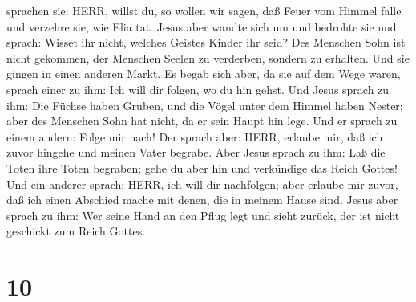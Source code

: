 sprachen sie: HERR, willst du, so wollen wir sagen, daß Feuer vom Himmel
falle und verzehre sie, wie Elia tat.  Jesus aber wandte
sich um und bedrohte sie und sprach: Wisset ihr nicht, welches Geistes
Kinder ihr seid?  Des Menschen Sohn ist nicht gekommen, der
Menschen Seelen zu verderben, sondern zu erhalten.  Und sie
gingen in einen anderen Markt. Es begab sich aber, da sie auf dem Wege
waren, sprach einer zu ihm: Ich will dir folgen, wo du hin gehst.
 Und Jesus sprach zu ihm: Die Füchse haben Gruben, und die
Vögel unter dem Himmel haben Nester; aber des Menschen Sohn hat nicht,
da er sein Haupt hin lege.  Und er sprach zu einem andern:
Folge mir nach! Der sprach aber: HERR, erlaube mir, daß ich zuvor
hingehe und meinen Vater begrabe.  Aber Jesus sprach zu
ihm: Laß die Toten ihre Toten begraben; gehe du aber hin und verkündige
das Reich Gottes!  Und ein anderer sprach: HERR, ich will
dir nachfolgen; aber erlaube mir zuvor, daß ich einen Abschied mache mit
denen, die in meinem Hause sind.  Jesus aber sprach zu ihm:
Wer seine Hand an den Pflug legt und sieht zurück, der ist nicht
geschickt zum Reich Gottes.

\hypertarget{section-9}{%
\section{10}\label{section-9}}

